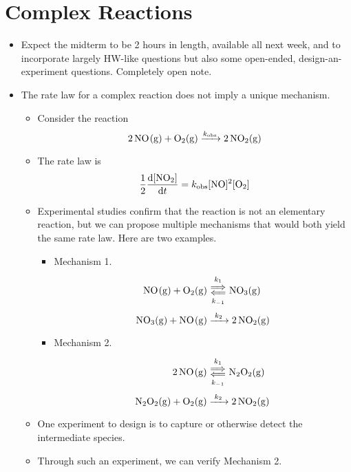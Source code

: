 \documentclass[../notes.tex]{subfiles}
\begin{document}
\section{Complex Reactions}
\begin{itemize}
    \item {}Expect the midterm to be 2 hours in length, available all next week, and to incorporate largely HW-like questions but also some open-ended, design-an-experiment questions. Completely open note.
    \item The rate law for a complex reaction does not imply a unique mechanism.
    \begin{itemize}
        \item Consider the reaction
        \begin{equation*}
            \ce{2NO(g) + O2(g) ->[$k_\text{obs}$] 2NO2(g)}
        \end{equation*}
        \item The rate law is
        \begin{equation*}
            \frac{1}{2}\dv{[\ce{NO2}]}{t} = k_\text{obs}[\ce{NO}]^2[\ce{O2}]
        \end{equation*}
        \item Experimental studies confirm that the reaction is not an elementary reaction, but we can propose multiple mechanisms that would both yield the same rate law. Here are two examples.
        \begin{itemize}
            \item Mechanism 1.
            \begin{align*}
                \ce{NO(g) + O2(g)} &\Longleftrightarrows[k_1][k_{-1}] \ce{NO3(g)}\\
                \ce{NO3(g) + NO(g)} &\ce{->[$k_2$]} \ce{2 NO2(g)}
            \end{align*}
            \item Mechanism 2.
            \begin{align*}
                \ce{2NO(g)} &\Longleftrightarrows[k_1][k_{-1}] \ce{N2O2(g)}\\
                \ce{N2O2(g) + O2(g)} &\ce{->[$k_2$]} \ce{2 NO2(g)}
            \end{align*}
        \end{itemize}
        \item One experiment to design is to capture or otherwise detect the intermediate species.
        \item Through such an experiment, we can verify Mechanism 2.

\end{itemize}
\end{itemize}
\end{document}
